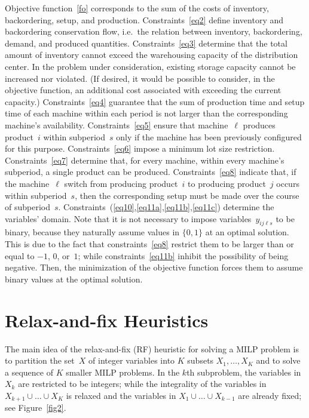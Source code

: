 \documentclass[11pt]{article}
\begin{document}
Objective function~\eqref{fo} corresponds to the sum of the costs of inventory, backordering, setup, and production. Constraints~\eqref{eq2} define inventory and backordering conservation flow, i.e.\ the relation between inventory, backordering, demand, and produced quantities. Constraints~\eqref{eq3} determine that the total amount of inventory cannot exceed the warehousing capacity of the distribution center. In the problem under consideration, existing storage capacity cannot be increased nor violated. (If desired, it would be possible to consider, in the objective function, an additional cost associated with exceeding the current capacity.) Constraints~\eqref{eq4} guarantee that the sum of production time and setup time of each machine within each period is not larger than the corresponding machine's availability. Constraints~\eqref{eq5} ensure that machine~$\ell$ produces product~$i$ within subperiod~$s$ only if the machine has been previously configured for this purpose. Constraints~\eqref{eq6} impose a minimum lot size restriction. Constraints~\eqref{eq7} determine that, for every machine, within every machine's subperiod, a single product can be produced. Constraints~\eqref{eq8} indicate that, if the machine~$\ell$ switch from producing product~$i$ to producing product~$j$ occurs within subperiod~$s$, then the corresponding setup must be made over the course of subperiod~$s$. Constraints~(\ref{eq10},\ref{eq11a},\ref{eq11b},\ref{eq11c}) determine the variables' domain. Note that it is not necessary to impose variables~$y_{i j \ell s}$ to be binary, because they naturally assume values in $\{0,1\}$ at an optimal solution. This is due to the fact that constraints~\eqref{eq8} restrict them to be larger than or equal to $-1$, $0$, or~$1$; while constraints~\eqref{eq11b} inhibit the possibility of being negative. Then, the minimization of the objective function forces them to assume binary values at the optimal solution. 

\section{Relax-and-fix Heuristics} \label{secrelax}

The main idea of the relax-and-fix (RF) heuristic \citep{pochetwolsey2006} for solving a MILP problem is to partition the set~$X$ of integer variables into $K$ subsets $X_1,\dots,X_K$ and to solve a sequence of $K$ smaller MILP problems. In the $k$th subproblem, the variables in $X_k$ are restricted to be integers; while the integrality of the variables in $X_{k+1} \cup \dots \cup X_K$ is relaxed and the variables in $X_1 \cup \dots \cup X_{k-1}$ are already fixed; see Figure~\ref{fig2}. 
\end{document}
